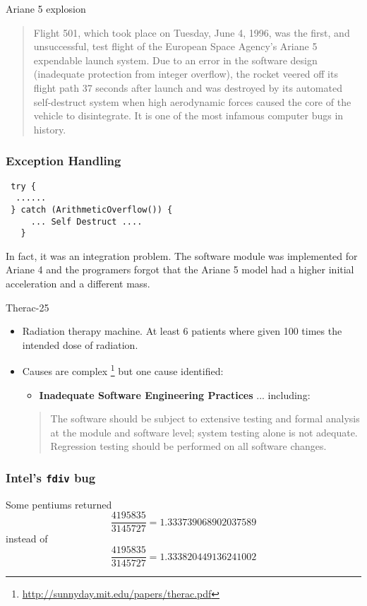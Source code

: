\documentclass{beamer}
\begin{document}
\begin{frame}{Ariane 5 explosion}
  \begin{quote}
    Flight 501, which took place on Tuesday, June 4, 1996, was the
    first, and unsuccessful, test flight of the European Space
    Agency's Ariane 5 expendable launch system. Due to an error in the
    software design (inadequate protection from integer overflow), the
    rocket veered off its flight path 37 seconds after launch and was
    destroyed by its automated self-destruct system when high
    aerodynamic forces caused the core of the vehicle to
    disintegrate. It is one of the most infamous computer bugs in
    history.
  \end{quote}
\end{frame}
\begin{frame}[fragile]
  \frametitle{Exception Handling}
\begin{lstlisting}
 try {
  ......
 } catch (ArithmeticOverflow()) {
     ... Self Destruct .... 
   } 
\end{lstlisting}
In fact, it was an integration problem. The software module was implemented for
Ariane 4 and the programers  forgot that the Ariane 5 model had a higher initial
acceleration and a different mass.  
\end{frame}
\begin{frame}{Therac-25}
  \begin{itemize}
  \item  Radiation therapy machine. At least 6 patients where given
    100 times the intended dose of radiation. 
  \item Causes are complex
    \footnote{\url{http://sunnyday.mit.edu/papers/therac.pdf}} but one
    cause identified:
    \begin{itemize}
    \item      {\bf Inadequate Software Engineering Practices} ... including:
    \end{itemize}
    \begin{quote}
     The software should be subject to extensive testing and formal
     analysis at the module and software level; system testing alone
     is not adequate.  Regression testing should be performed on all
     software changes. 
    \end{quote}
  \end{itemize}  
\end{frame}
\begin{frame}
  \frametitle{Intel's {\tt fdiv} bug}
   
Some pentiums returned
\[
\frac{4195835}{3145727} = 1.333739068902037589
\]
instead of 
\[
\frac{4195835}{3145727} = 1.333820449136241002
\]

\end{frame}
\end{document}
